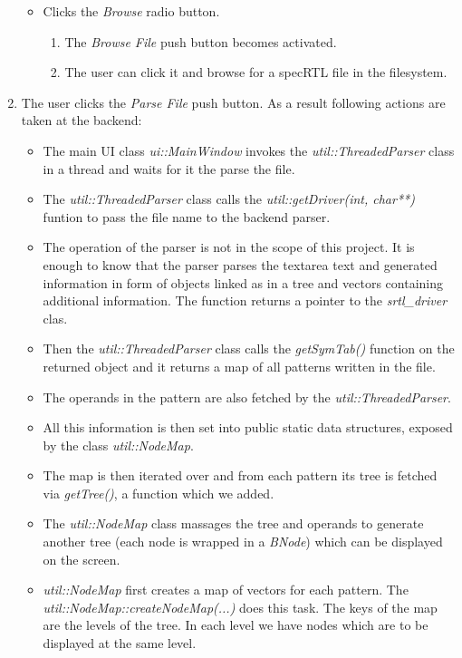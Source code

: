 \begin{enumerate}
{ \begin{itemize}
  \item Clicks the \emph{Browse} radio button.
  \begin{enumerate}
   \item The \emph{Browse File} push button becomes activated.
   \item The user can click it and browse for a specRTL file in the filesystem.
  \end{enumerate}
 \end{itemize}	%
 }
 \item {The user clicks the \emph{Parse File} push button. As a result following actions are taken at the backend:
 \begin{itemize}
  \item The main UI class \emph{ui::MainWindow} invokes the \emph{util::ThreadedParser} class in a thread and waits for it the parse the file.
  \item The \emph{util::ThreadedParser} class calls the \emph{util::getDriver(int, char**)} funtion to pass the file name to the backend parser.
  \item The operation of the parser is not in the scope of this project. It is enough to know that the parser parses the textarea text and generated information in form of objects linked as in a tree and vectors containing additional information. The function returns a pointer to the \emph{srtl\_driver} clas.
  \item Then the \emph{util::ThreadedParser} class calls the \emph{getSymTab()} function on the returned object and it returns a map\cite{7} of all patterns written in the file.
  \item The operands in the pattern are also fetched by the \emph{util::ThreadedParser}.
  \item All this information is then set into public static data structures, exposed by the class \emph{util::NodeMap}.
  \item The map is then iterated over and from each pattern its tree is fetched via \emph{getTree()}, a function which we added.
  \item The \emph{util::NodeMap} class massages the tree and operands to generate another tree (each node is wrapped in a \emph{BNode}) which can be displayed on the screen.
  \item \emph{util::NodeMap} first creates a map of vectors for each pattern. The \emph{util::NodeMap::createNodeMap(...)} does this task. The keys of the map are the levels of the tree. In each level we have nodes which are to be displayed at the same level.

\end{itemize}}
\end{enumerate}
